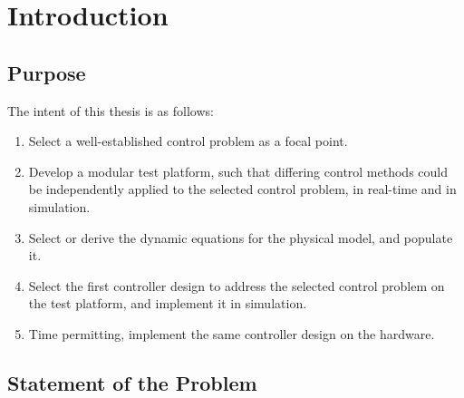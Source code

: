 \documentclass[crop=false,float=true,class=scrreprt]{standalone}
\begin{document}
\chapter{Introduction}





\section{Purpose}

The intent of this thesis is as follows:

\begin{enumerate}[leftmargin=*]

\item Select a well-established control problem as a focal point.

\item Develop a modular test platform, 
      such that differing control methods could be independently applied to the selected control problem,
      in real-time and in simulation.\\

\item Select or derive the dynamic equations for the physical model, and populate it.

\item Select the first controller design to address the selected control problem 
      on the test platform, and implement it in simulation.

\item Time permitting, implement the same controller design on the hardware.

\end{enumerate}




\clearpage




\section{Statement of the Problem}
\end{document}
